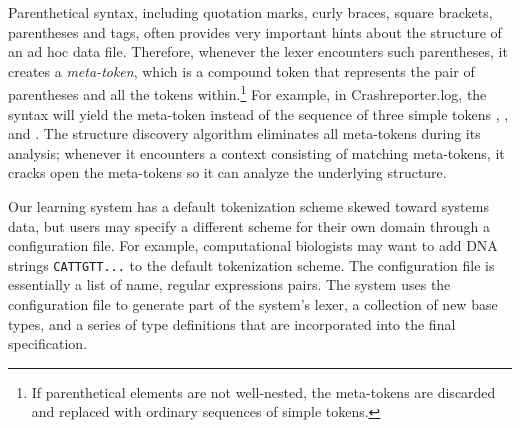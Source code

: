 Parenthetical syntax, including quotation marks, curly braces, square brackets,
parentheses and \xml{} tags,
often provides very important hints about the structure
of an ad hoc data file.  Therefore, whenever the lexer encounters 
such parentheses, it creates a {\em meta-token}, which is a compound
token that 
represents the pair of parentheses and all the tokens 
within.\footnote{If parenthetical elements
are not well-nested, the meta-tokens are discarded and replaced with
ordinary sequences of simple tokens.}  For example, in Crashreporter.log,
the syntax \cd{[2164]} will yield the meta-token \cd{[*]} instead of
the sequence of three simple tokens \cd{[}, , and \cd{]}.  
The structure discovery algorithm eliminates all meta-tokens during
its analysis; whenever it encounters a context consisting of
matching meta-tokens, it cracks open the meta-tokens so it can analyze
the underlying structure.

Our learning system has a default tokenization scheme skewed toward systems
data, but users may specify a different scheme for their own domain
through a configuration file.  For example, computational biologists
may want to add DNA strings {\tt CATTGTT...} to the default tokenization 
scheme.  The configuration file is essentially
a list of name, regular expressions pairs.  The system uses the configuration
file to generate part of the system's lexer, a
collection of new \ir{} base types, and a series of type 
definitions that are incorporated into the final \pads{} specification.  






